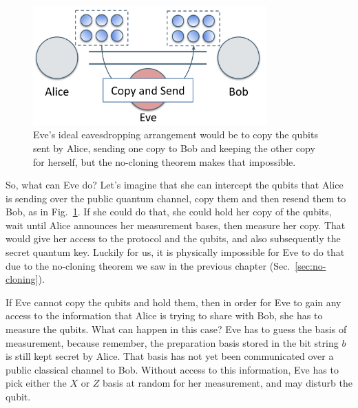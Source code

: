 \begin{figure}[H]
    \centering
    \includegraphics[width=0.8\textwidth]{lesson9/eve-copy-and-send.png}
        \caption[Eve's ideal (but impossible) eavesdropping arrangement]{Eve's ideal eavesdropping arrangement would be to copy the qubits sent by Alice, sending one copy to Bob and keeping the other copy for herself, but the no-cloning theorem makes that impossible.}
    \label{fig:eve-copy-and-send}
\end{figure}


So, what can Eve do? Let's imagine that she can intercept the qubits that Alice is sending over the public quantum channel, copy them and then resend them to Bob, as in Fig.~\ref{fig:eve-copy-and-send}. If she could do that, she could hold her copy of the qubits, wait until Alice announces her measurement bases, then measure her copy.  That would give her access to the protocol and the qubits, and also subsequently the secret quantum key. Luckily for us, it is physically impossible for Eve to do that due to the no-cloning theorem we saw in the previous chapter (Sec.~\ref{sec:no-cloning}).

If Eve cannot copy the qubits and hold them, then in order for Eve to gain any access to the information that Alice is trying to share with Bob, she has to measure the qubits. What can happen in this case? Eve has to guess the basis of measurement, because remember, the preparation basis stored in the bit string $b$ is still kept secret by Alice. That basis has not yet been communicated over a public classical channel to Bob. Without access to this information, Eve has to pick either the $X$ or $Z$ basis at random for her measurement, and may disturb the qubit.

